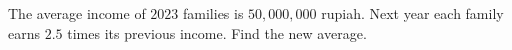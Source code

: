 The average income of $2023$ families is $50{,}000{,}000$ rupiah. Next year each family earns $2.5$ times its previous income. Find the new average.

